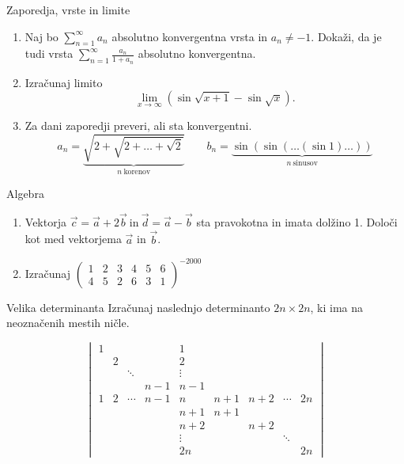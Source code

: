 \begin{frame}{Zaporedja, vrste in limite}
	\begin{enumerate}
		\item 
		Naj bo $\sum _{n=1}^{\infty} a_n$ absolutno konvergentna vrsta in $a_n \ne -1$.
		Dokaži, da je tudi vrsta $\sum_{n=1}^\infty \frac{a_n}{1+a_n}$
		absolutno konvergentna.

		\item
		Izračunaj limito
		$$\lim_{x \rightarrow \infty}(\sin\sqrt{x + 1} - \sin\sqrt{x}).$$

		\item
		Za dani zaporedji preveri, ali sta konvergentni.
		$$ a_n =\underbrace{ \sqrt{2+\sqrt{2+\dots+\sqrt{2}}}}_{n~\text{korenov}} \qquad
		 b_n =\underbrace{ \sin(\sin(\dots(\sin 1)\dots))}_{n~\text{sinusov}}
		$$
	\end{enumerate}
\end{frame}

\begin{frame}{Algebra}
	\begin{enumerate}
		\item
		Vektorja $\vec{c} = \vec{a} + 2\vec{b}~\text{in}~ \vec{d}=\vec{a}-\vec{b} $
		sta pravokotna in imata dolžino 1. Določi kot med vektorjema $\vec{a}$ in $\vec{b}$.
		\item 
		Izračunaj
	$	\begin{pmatrix}
		1 & 2 &3&4&5&6\\
		4&5&2&6&3&1
		\end{pmatrix}^{-2000}
$
	\end{enumerate}
\end{frame}

\begin{frame}{Velika determinanta}
	Izračunaj naslednjo determinanto $2n \times 2n$, ki ima na neoznačenih mestih ničle.

\[
\begin{vmatrix}
1		&  		&   	&		& 1 	&  		&  		& 		& 		 \\
 		& 2 	&  		&		& 2 	&  		& 		& 		& 		 \\
 		&  		& \ddots&		& \vdots&  		&  		& 		& 		 \\
 		& 		&    	&n-1	& n-1 	&  		& 		& 		& 		 \\
1		& 2 	& \cdots&n-1	& n 	& n+1 	& n+2	&\cdots &2n 	 \\
 		&		& 		&		& n+1 	& n+1 	& 	 	& 	 	& 	 	 \\
	 	& 		& 		&		& n+2	& 		& n+2	& 		& 		 \\
 		& 	 	& 		&		& \vdots&   	& 		& \ddots&  		\\
		&		&		&		&2n		&		&		&		&2n
\end{vmatrix}
\]


\end{frame}

